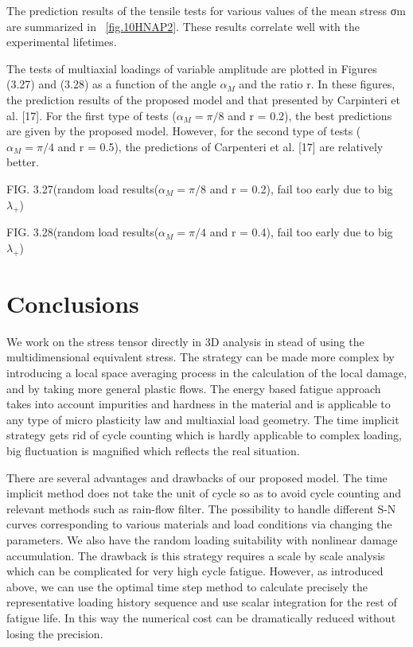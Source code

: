 \documentclass[3p,times,number,review]{elsarticle}
\newcommand{\figref}[1]{\figurename~\ref{#1}}
\begin{document}
The prediction results of the tensile tests for various values of the mean stress σm are summarized in \figref{fig.10HNAP2}. These results correlate well with the experimental lifetimes. 

The tests of multiaxial loadings of variable amplitude are plotted in Figures (3.27) and (3.28) as a function of the angle $\alpha_{M}$ and the ratio r. In these figures, the prediction results of the proposed model and that presented by Carpinteri et al. [17]. For the first type of tests ($\alpha_{M} = \pi/8$ and r = 0.2), the best predictions are given by the proposed model.
However, for the second type of tests ($\alpha_{M} = \pi/4$ and r = 0.5), the predictions of Carpenteri et al. [17] are relatively better.

FIG. 3.27(random load results($\alpha_{M} = \pi/8$ and r = 0.2), fail too early due to big $\lambda_+$)

FIG. 3.28(random load results($\alpha_{M} = \pi/4$ and r = 0.4), fail too early due to big $\lambda_+$)

\clearpage
\section{Conclusions}

We work on the stress tensor directly in 3D analysis in stead of using the multidimensional equivalent stress.
The strategy can be made more complex by introducing a local space averaging process in the calculation of the local damage, and by taking more general plastic flows. The energy based fatigue approach takes into account impurities and hardness in the material and is applicable to any type of micro plasticity law and multiaxial load geometry. The time implicit strategy gets rid of cycle counting which is hardly applicable to complex loading, big fluctuation is magnified which reflects the real situation.

There are several advantages and drawbacks of our proposed model. The time implicit method does not take the unit of cycle so as to avoid cycle counting and relevant methods such as rain-flow filter. The possibility to handle different S-N curves corresponding to various materials and load conditions via changing the parameters. We also have the random loading suitability with nonlinear damage accumulation. The drawback is this strategy requires a scale by scale analysis which can be complicated for very high cycle fatigue. However, as introduced above, we can use the optimal time step method to calculate precisely the representative loading history sequence and use scalar integration for the rest of fatigue life. In this way the numerical cost can be dramatically reduced without losing the precision.
\end{document}
